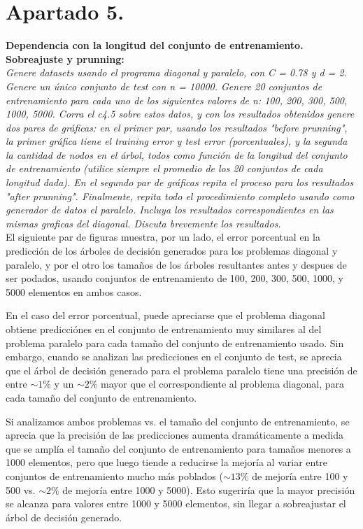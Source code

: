 \documentclass[a4paper, 11pt]{article} %
\begin{document}
\section*{Apartado 5.} 
\textbf{Dependencia con la longitud del conjunto de entrenamiento.
Sobreajuste y prunning:}\\ 
\textit{Genere datasets usando el programa diagonal y paralelo, con C = 0.78 y
d = 2. Genere un único conjunto de test con n = 10000.  Genere 20 conjuntos de
entrenamiento para cada uno de los siguientes valores de n: 100, 200, 300, 500,
1000, 5000.  Corra el c4.5 sobre estos datos, y con los resultados obtenidos
genere dos pares de gráficas: en el primer par, usando los resultados "before
prunning", la primer gráfica tiene el training error y test error
(porcentuales), y la segunda la cantidad de nodos en el árbol, todos como
función de la longitud del conjunto de entrenamiento (utilice siempre el
promedio de los 20 conjuntos de cada longitud dada). En el segundo par de
gráficas repita el proceso para los resultados "after prunning".  Finalmente,
repita todo el procedimiento completo usando como generador de datos el
paralelo. Incluya los resultados correspondientes en las mismas graficas del
diagonal. Discuta brevemente los resultados.}\\

El siguiente par de figuras muestra, por un lado, el error porcentual en la
predicción de los árboles de decisión generados para los problemas diagonal y
paralelo, y por el otro los tamaños de los árboles resultantes antes y despues
de ser podados, usando conjuntos de entrenamiento de 100, 200, 300, 500, 1000,
y 5000 elementos en ambos casos.

En el caso del error porcentual, puede apreciarse que el problema diagonal
obtiene predicciónes en el conjunto de entrenamiento muy similares al del
problema paralelo para cada tamaño del conjunto de entrenamiento usado. Sin
embargo, cuando se analizan las predicciones en el conjunto de test, se aprecia
que el árbol de decisión generado para el problema paralelo tiene una precisión
de entre $\sim1\%$ y un $\sim2\%$ mayor que el correspondiente al problema
diagonal, para cada tamaño del conjunto de entrenamiento.

Si analizamos ambos problemas vs. el tamaño del conjunto de entrenamiento, se
aprecia que la precisión de las predicciones aumenta dramáticamente a medida
que se amplía el tamaño del conjunto de entrenamiento para tamaños menores a
1000 elementos, pero que luego tiende a reducirse la mejoría al variar entre
conjuntos de entrenamiento mucho más poblados ($\sim13\%$ de mejoría entre 100
y 500 vs. $\sim2\%$ de mejoría entre 1000 y 5000). Esto sugeriría que la mayor
precisión se alcanza para valores entre 1000 y 5000 elementos, sin llegar a
sobreajustar el árbol de decisión generado.
\end{document}
